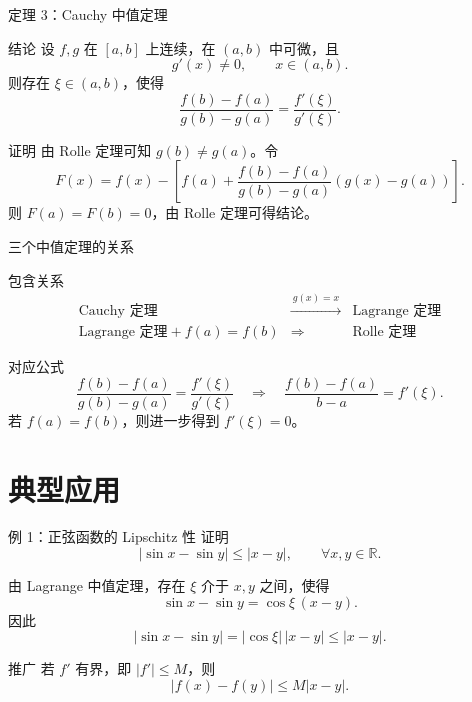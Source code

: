 \documentclass[aspectratio=169,10pt]{ctexbeamer}
\newcommand{\R}{\mathbb{R}}
\begin{document}
\begin{frame}[t]{定理 3：Cauchy 中值定理}
\small
\begin{block}{结论}
设 $f,g$ 在 $[a,b]$ 上连续，在 $(a,b)$ 中可微，且
\[
  g'(x)\ne0,\qquad x\in(a,b).
\]
则存在 $\xi\in(a,b)$，使得
\[
  \frac{f(b)-f(a)}{g(b)-g(a)}
  =
  \frac{f'(\xi)}{g'(\xi)}.
\]
\end{block}

\begin{block}{证明}
由 Rolle 定理可知 $g(b)\ne g(a)$。令
\[
  F(x)=f(x)-\left[f(a)+\frac{f(b)-f(a)}{g(b)-g(a)}(g(x)-g(a))\right].
\]
则 $F(a)=F(b)=0$，由 Rolle 定理可得结论。
\end{block}
\end{frame}

\begin{frame}[t]{三个中值定理的关系}
\footnotesize
\begin{block}{包含关系}
\[
\begin{array}{ccl}
\text{Cauchy 定理} & \xrightarrow{\ g(x)=x\ } & \text{Lagrange 定理}\\[0.4em]
\text{Lagrange 定理}+f(a)=f(b) & \Longrightarrow & \text{Rolle 定理}
\end{array}
\]
\end{block}

\begin{block}{对应公式}
\[
  \frac{f(b)-f(a)}{g(b)-g(a)}
  =
  \frac{f'(\xi)}{g'(\xi)}
  \quad\Longrightarrow\quad
  \frac{f(b)-f(a)}{b-a}=f'(\xi).
\]
若 $f(a)=f(b)$，则进一步得到 $f'(\xi)=0$。
\end{block}
\end{frame}

\section{典型应用}

\begin{frame}[t]{例 1：正弦函数的 Lipschitz 性}
\small
证明
\[
  |\sin x-\sin y|\le |x-y|,\qquad \forall x,y\in\R.
\]

由 Lagrange 中值定理，存在 $\xi$ 介于 $x,y$ 之间，使得
\[
  \sin x-\sin y=\cos\xi\,(x-y).
\]
因此
\[
  |\sin x-\sin y|
  =|\cos\xi|\,|x-y|
  \le |x-y|.
\]

\begin{alertblock}{推广}
若 $f'$ 有界，即 $|f'|\le M$，则
\[
  |f(x)-f(y)|\le M|x-y|.
\]
\end{alertblock}
\end{frame}
\end{document}
